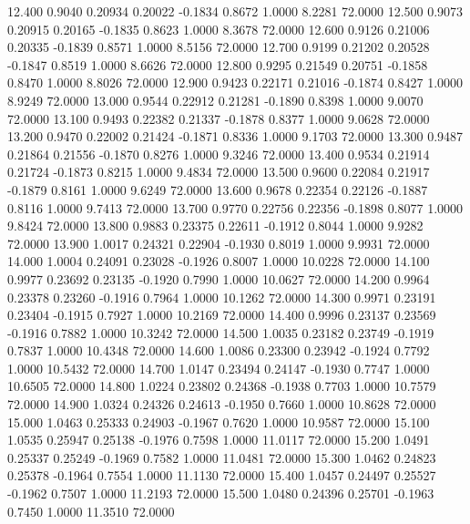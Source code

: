   12.400   0.9040   0.20934   0.20022  -0.1834   0.8672   1.0000   8.2281  72.0000
  12.500   0.9073   0.20915   0.20165  -0.1835   0.8623   1.0000   8.3678  72.0000
  12.600   0.9126   0.21006   0.20335  -0.1839   0.8571   1.0000   8.5156  72.0000
  12.700   0.9199   0.21202   0.20528  -0.1847   0.8519   1.0000   8.6626  72.0000
  12.800   0.9295   0.21549   0.20751  -0.1858   0.8470   1.0000   8.8026  72.0000
  12.900   0.9423   0.22171   0.21016  -0.1874   0.8427   1.0000   8.9249  72.0000
  13.000   0.9544   0.22912   0.21281  -0.1890   0.8398   1.0000   9.0070  72.0000
  13.100   0.9493   0.22382   0.21337  -0.1878   0.8377   1.0000   9.0628  72.0000
  13.200   0.9470   0.22002   0.21424  -0.1871   0.8336   1.0000   9.1703  72.0000
  13.300   0.9487   0.21864   0.21556  -0.1870   0.8276   1.0000   9.3246  72.0000
  13.400   0.9534   0.21914   0.21724  -0.1873   0.8215   1.0000   9.4834  72.0000
  13.500   0.9600   0.22084   0.21917  -0.1879   0.8161   1.0000   9.6249  72.0000
  13.600   0.9678   0.22354   0.22126  -0.1887   0.8116   1.0000   9.7413  72.0000
  13.700   0.9770   0.22756   0.22356  -0.1898   0.8077   1.0000   9.8424  72.0000
  13.800   0.9883   0.23375   0.22611  -0.1912   0.8044   1.0000   9.9282  72.0000
  13.900   1.0017   0.24321   0.22904  -0.1930   0.8019   1.0000   9.9931  72.0000
  14.000   1.0004   0.24091   0.23028  -0.1926   0.8007   1.0000  10.0228  72.0000
  14.100   0.9977   0.23692   0.23135  -0.1920   0.7990   1.0000  10.0627  72.0000
  14.200   0.9964   0.23378   0.23260  -0.1916   0.7964   1.0000  10.1262  72.0000
  14.300   0.9971   0.23191   0.23404  -0.1915   0.7927   1.0000  10.2169  72.0000
  14.400   0.9996   0.23137   0.23569  -0.1916   0.7882   1.0000  10.3242  72.0000
  14.500   1.0035   0.23182   0.23749  -0.1919   0.7837   1.0000  10.4348  72.0000
  14.600   1.0086   0.23300   0.23942  -0.1924   0.7792   1.0000  10.5432  72.0000
  14.700   1.0147   0.23494   0.24147  -0.1930   0.7747   1.0000  10.6505  72.0000
  14.800   1.0224   0.23802   0.24368  -0.1938   0.7703   1.0000  10.7579  72.0000
  14.900   1.0324   0.24326   0.24613  -0.1950   0.7660   1.0000  10.8628  72.0000
  15.000   1.0463   0.25333   0.24903  -0.1967   0.7620   1.0000  10.9587  72.0000
  15.100   1.0535   0.25947   0.25138  -0.1976   0.7598   1.0000  11.0117  72.0000
  15.200   1.0491   0.25337   0.25249  -0.1969   0.7582   1.0000  11.0481  72.0000
  15.300   1.0462   0.24823   0.25378  -0.1964   0.7554   1.0000  11.1130  72.0000
  15.400   1.0457   0.24497   0.25527  -0.1962   0.7507   1.0000  11.2193  72.0000
  15.500   1.0480   0.24396   0.25701  -0.1963   0.7450   1.0000  11.3510  72.0000
